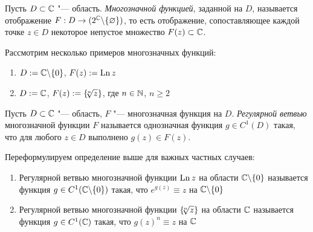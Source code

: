 
\begin{definition}
	Пусть $D \subset \mathbb{C}$ "--- область. \textit{Многозначной функцией}, заданной на $D$, называется отображение $F : D \to (2^{\mathbb{C}} \backslash \{\varnothing\})$, то есть отображение, сопоставляющее каждой точке $z \in D$ некоторое непустое множество $F(z) \subset \mathbb{C}$.
\end{definition}

\begin{example}
	Рассмотрим несколько примеров многозначных функций:
	\begin{enumerate}
		\item $D := \mathbb{C} \backslash \{0\}$, $F(z) := \operatorname{Ln}{z}$
		\item $D := \mathbb{C}$, $F(z) := \left\{\!\!\sqrt[n]{z}\right\}$, где $n \in \mathbb{N}$, $n \ge 2$
	\end{enumerate}
\end{example}

\begin{definition}
	Пусть $D \subset \mathbb{C}$ "--- область, $F$ "--- многозначная функция на $D$. \textit{Регулярной ветвью} многозначной функции $F$ называется однозначная функция $g \in C^1(D)$ такая, что для любого $z \in D$ выполнено $g(z) \in F(z)$.
\end{definition}

\begin{note}
	Переформулируем определение выше для важных частных случаев:
	\begin{enumerate}
		\item Регулярной ветвью многозначной функции $\operatorname{Ln}{z}$ на области $\mathbb{C} \backslash \{0\}$ называется функция $g \in C^1(\mathbb{C} \backslash \{0\})$ такая, что $e^{g(z)} \equiv z$ на $\mathbb{C} \backslash \{0\}$
		\item Регулярной ветвью многозначной функции $\left\{\!\!\sqrt[n]{z}\right\}$ на области $\mathbb{C}$ называется функция $g \in C^1(\mathbb{C})$ такая, что $g(z)^n \equiv z$ на $\mathbb{C}$
	\end{enumerate}
\end{note}

